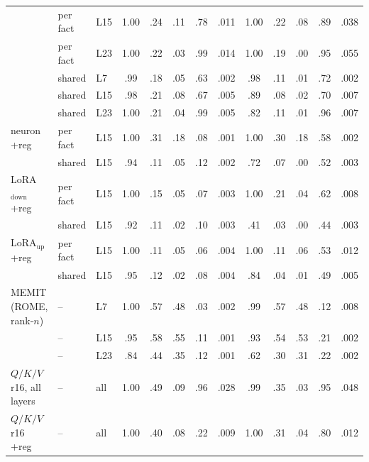\documentclass[11pt]{article}
\begin{document}
\begin{table}[t]
{\begin{tabular}{lll ccccc ccccc}
 & per fact & L15 & 1.00 & .24 & .11 & .78 & .011 & 1.00 & .22 & .08 & .89 & .038 \\
 & per fact & L23 & 1.00 & .22 & .03 & .99 & .014 & 1.00 & .19 & .00 & .95 & .055 \\
 & shared & L7 & .99 & .18 & .05 & .63 & .002 & .98 & .11 & .01 & .72 & .002 \\
 & shared & L15 & .98 & .21 & .08 & .67 & .005 & .89 & .08 & .02 & .70 & .007 \\
 & shared & L23 & 1.00 & .21 & .04 & .99 & .005 & .82 & .11 & .01 & .96 & .007 \\
neuron +reg & per fact & L15 & 1.00 & .31 & .18 & .08 & .001 & 1.00 & .30 & .18 & .58 & .002 \\
 & shared & L15 & .94 & .11 & .05 & .12 & .002 & .72 & .07 & .00 & .52 & .003 \\
LoRA$_\text{down}$ +reg & per fact & L15 & 1.00 & .15 & .05 & .07 & .003 & 1.00 & .21 & .04 & .62 & .008 \\
 & shared & L15 & .92 & .11 & .02 & .10 & .003 & .41 & .03 & .00 & .44 & .003 \\
LoRA$_\text{up}$ +reg & per fact & L15 & 1.00 & .11 & .05 & .06 & .004 & 1.00 & .11 & .06 & .53 & .012 \\
 & shared & L15 & .95 & .12 & .02 & .08 & .004 & .84 & .04 & .01 & .49 & .005 \\
MEMIT (ROME, rank-$n$) & -- & L7 & 1.00 & .57 & .48 & .03 & .002 & .99 & .57 & .48 & .12 & .008 \\
 & -- & L15 & .95 & .58 & .55 & .11 & .001 & .93 & .54 & .53 & .21 & .002 \\
 & -- & L23 & .84 & .44 & .35 & .12 & .001 & .62 & .30 & .31 & .22 & .002 \\
$Q/K/V$ r16, all layers & -- & all & 1.00 & .49 & .09 & .96 & .028 & .99 & .35 & .03 & .95 & .048 \\
$Q/K/V$ r16 +reg & -- & all & 1.00 & .40 & .08 & .22 & .009 & 1.00 & .31 & .04 & .80 & .012 \\
\bottomrule
\end{tabular}}
\end{table}
\end{document}
